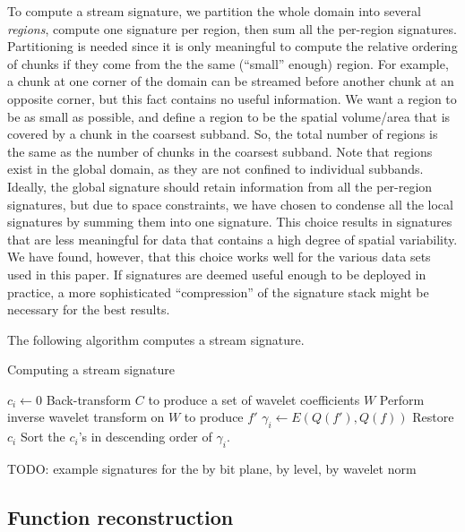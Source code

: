To compute a stream signature, we partition the whole domain into several \emph{regions}, compute
one signature per region, then sum all the per-region signatures. Partitioning is needed since it is
only meaningful to compute the relative ordering of chunks if they come from the the same (``small''
enough) region. For example, a chunk at one corner of the domain can be streamed before another
chunk at an opposite corner, but this fact contains no useful information. We want a region to be as
small as possible, and define a region to be the spatial volume/area that is covered by a chunk in
the coarsest subband. So, the total number of regions is the same as the number of chunks in the
coarsest subband. Note that regions exist in the global domain, as they are not confined to
individual subbands. Ideally, the global signature should retain information from all the per-region
signatures, but due to space constraints, we have chosen to condense all the local signatures by
summing them into one signature. This choice results in signatures that are less meaningful for data
that contains a high degree of spatial variability. We have found, however, that this choice works
well for the various data sets used in this paper. If signatures are deemed useful enough to be
deployed in practice, a more sophisticated ``compression'' of the signature stack might be necessary
for the best results.

The following algorithm computes a stream signature.

\begin{algorithm}[h]
  \caption{Computing a stream signature}
  \begin{algorithmic}[1]
			\State $c_i \gets 0$
      \State Back-transform $C$ to produce a set of wavelet coefficients $W$
			\State Perform inverse wavelet transform on $W$ to produce $f'$
			\State $\gamma_i \gets E(Q(f'),Q(f))$			
			\State Restore $c_i$
		\EndFor
		\State Sort the $c_i$'s in descending order of $\gamma_i$.
	\end{algorithmic}
	\label{alg:greedy}
\end{algorithm}

TODO: example signatures for the by bit plane, by level, by wavelet norm

\subsection{Function reconstruction}
\label{sec:rmse-optimized}

